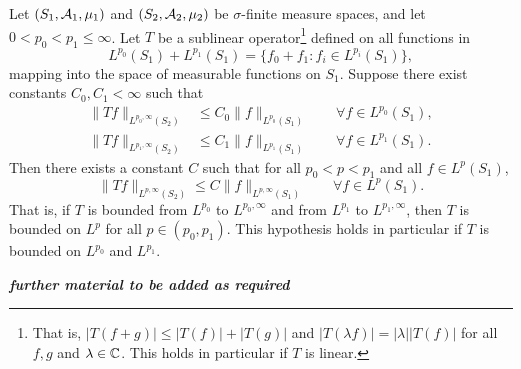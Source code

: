 \begin{thm}[Marcinkiewicz]\label{thm:marcinkiewicz}
  Let $(S_1,\mathcal{A}_1,\mu_1)$ and $(S_2,\mathcal{A}_2,\mu_2)$ be $\sigma$-finite measure spaces, and let $0 < p_0 < p_1 \leq \infty$.
  Let $T$ be a sublinear operator\footnote{That is, $|T(f + g)| \leq |T(f)| + |T(g)|$ and $|T(\lambda f)| = |\lambda||T(f)|$ for all $f,g$ and $\lambda \in \mathbb{C}$. This holds in particular if $T$ is linear.} defined on all functions in
  \begin{equation*}
    L^{p_0}(S_1) + L^{p_1}(S_1) = \{f_0 + f_1 : f_i \in L^{p_i}(S_1)\},
  \end{equation*}
  mapping into the space of measurable functions on $S_1$.
  Suppose there exist constants $C_0, C_1 < \infty$ such that
  \begin{equation*}
    \begin{aligned}
      \|Tf\|_{L^{p_0,\infty}(S_2)} &\leq C_0 \|f\|_{L^{p_0}(S_1)} \qquad \forall f \in L^{p_0}(S_1), \\
      \|Tf\|_{L^{p_1,\infty}(S_2)} &\leq C_1 \|f\|_{L^{p_1}(S_1)} \qquad \forall f \in L^{p_1}(S_1).
    \end{aligned}
  \end{equation*}
  Then there exists a constant $C$ such that for all $p_0 < p < p_1$ and all $f \in L^p(S_1)$,
  \begin{equation*}
    \|Tf\|_{L^{p,\infty}(S_2)} \leq C \|f\|_{L^{p,\infty}(S_1)} \qquad \forall f \in L^{p}(S_1).
  \end{equation*}
  That is, if $T$ is bounded from $L^{p_0}$ to $L^{p_0,\infty}$ and from $L^{p_1}$ to $L^{p_1,\infty}$, then $T$ is bounded on $L^p$ for all $p \in (p_0,p_1)$.
  This hypothesis holds in particular if $T$ is bounded on $L^{p_0}$ and $L^{p_1}$.
\end{thm}




\emph{\textbf{further material to be added as required}}







